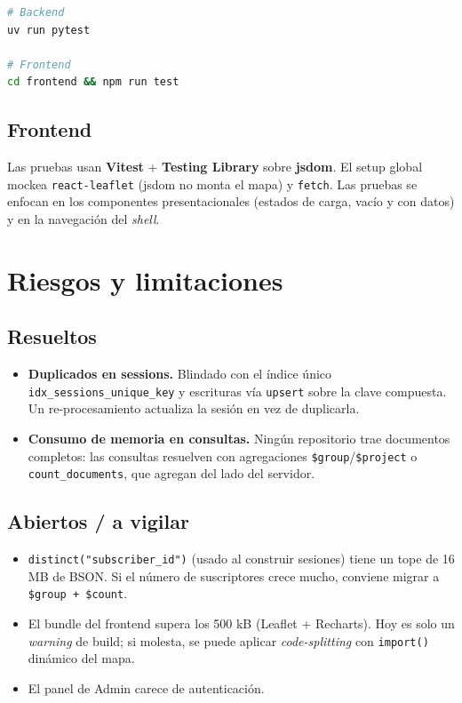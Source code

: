 \documentclass[12pt, letterpaper]{article}
\newcommand{\code}[1]{\texttt{#1}}
\begin{document}
\begin{lstlisting}[language=bash,caption={Ejecución de pruebas}]
# Backend
uv run pytest

# Frontend
cd frontend && npm run test
\end{lstlisting}

\subsection{Frontend}
Las pruebas usan \textbf{Vitest} + \textbf{Testing Library} sobre \textbf{jsdom}.
El setup global mockea \code{react-leaflet} (jsdom no monta el mapa) y
\code{fetch}. Las pruebas se enfocan en los componentes presentacionales
(estados de carga, vacío y con datos) y en la navegación del \emph{shell}.

\section{Riesgos y limitaciones}
\subsection{Resueltos}
\begin{itemize}[leftmargin=*]
  \item \textbf{Duplicados en sessions.} Blindado con el índice único
        \code{idx\_sessions\_unique\_key} y escrituras vía \code{upsert} sobre la
        clave compuesta. Un re-procesamiento actualiza la sesión en vez de
        duplicarla.
  \item \textbf{Consumo de memoria en consultas.} Ningún repositorio trae
        documentos completos: las consultas resuelven con agregaciones
        \code{\$group}/\code{\$project} o \code{count\_documents}, que agregan del
        lado del servidor.
\end{itemize}

\subsection{Abiertos / a vigilar}
\begin{itemize}[leftmargin=*]
  \item \code{distinct("subscriber\_id")} (usado al construir sesiones) tiene un
        tope de 16 MB de BSON. Si el número de suscriptores crece mucho, conviene
        migrar a \code{\$group + \$count}.
  \item El bundle del frontend supera los 500 kB (Leaflet + Recharts). Hoy es
        solo un \emph{warning} de build; si molesta, se puede aplicar
        \emph{code-splitting} con \code{import()} dinámico del mapa.
  \item El panel de Admin carece de autenticación.
\end{itemize}
\end{document}
